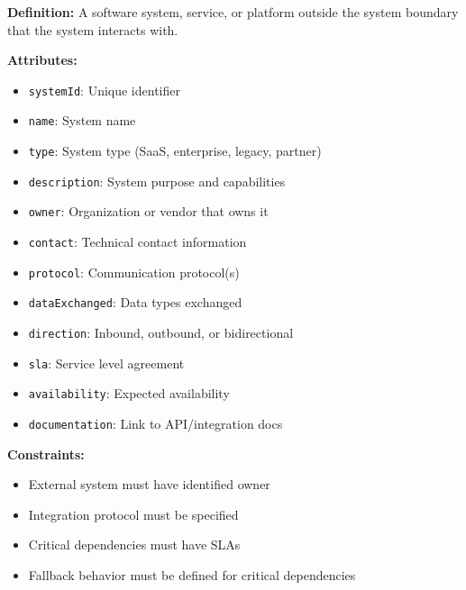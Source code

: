 \documentclass[11pt,letterpaper]{article}
\begin{document}
\begin{definitionbox}
\textbf{Definition:} A software system, service, or platform outside the system boundary that the system interacts with.

\textbf{Attributes:}
\begin{itemize}[nosep]
    \item \texttt{systemId}: Unique identifier
    \item \texttt{name}: System name
    \item \texttt{type}: System type (SaaS, enterprise, legacy, partner)
    \item \texttt{description}: System purpose and capabilities
    \item \texttt{owner}: Organization or vendor that owns it
    \item \texttt{contact}: Technical contact information
    \item \texttt{protocol}: Communication protocol(s)
    \item \texttt{dataExchanged}: Data types exchanged
    \item \texttt{direction}: Inbound, outbound, or bidirectional
    \item \texttt{sla}: Service level agreement
    \item \texttt{availability}: Expected availability
    \item \texttt{documentation}: Link to API/integration docs
\end{itemize}

\textbf{Constraints:}
\begin{itemize}[nosep]
    \item External system must have identified owner
    \item Integration protocol must be specified
    \item Critical dependencies must have SLAs
    \item Fallback behavior must be defined for critical dependencies
\end{itemize}
\end{definitionbox}
\end{document}

